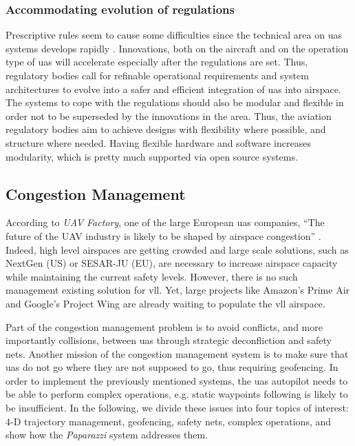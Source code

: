 \subsubsection{Accommodating evolution of regulations}
Prescriptive rules seem to cause some difficulties since the technical area on \gls{uas} systems develops rapidly \cite{A_NPA_EASA2015}. Innovations, both on the aircraft and on the operation type of \gls{uas} will accelerate especially after the regulations are set. Thus, regulatory bodies call for refinable operational requirements and system architectures to evolve into a safer and efficient integration of \gls{uas} into airspace. The systems to cope with the regulations should also be modular and flexible in order not to be superseded by the innovations in the area. 
Thus, the aviation regulatory bodies aim to achieve designs with flexibility where possible, and structure where needed. Having flexible hardware and software increases modularity, which is pretty much supported via open source systems.

\subsection{Congestion Management}
According to \textit{UAV Factory}, one of the large European \gls{uas} companies, ``The future of the UAV industry is likely to be shaped by airspace congestion'' \cite{europe_report_civilian_drone}.
	Indeed, high level airspaces are getting crowded and large scale solutions, such as NextGen (US) or SESAR-JU (EU), are necessary to increase airspace capacity while maintaining the current safety levels.
	However, there is no such management existing solution for \gls{vll}. Yet, large projects like Amazon's Prime Air and Google's Project Wing are already waiting to populate the \gls{vll} airspace.	
	
	Part of the congestion management problem is to avoid conflicts, and more importantly collisions, between \gls{uas} through strategic deconfliction and safety nets.
	Another mission of the congestion management system is to make sure that \gls{uas} do not go where they are not supposed to go, thus requiring geofencing.
	In order to implement the previously mentioned systems, the \gls{uas} autopilot needs to be able to perform complex operations, e.g. static waypoints following is likely to be insufficient.
	In the following, we divide these issues into four topics of interest: 4-D trajectory management, geofencing, safety nets, complex operations, and show how the \emph{Paparazzi} system addresses them.
	
